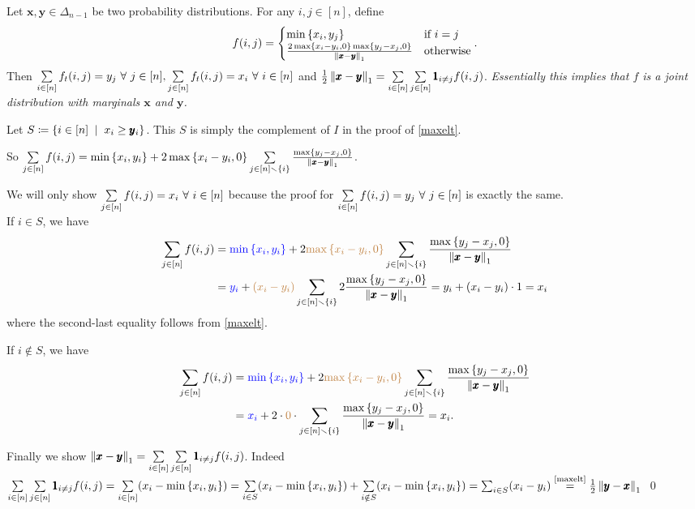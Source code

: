 \begin{lemma}\label{couple}
Let $\pmb x,\pmb y\in \Delta_{n-1}$ be two probability distributions. For any $i,j\in[n]$, define $$f(i,j) = \begin{cases}
\min\left\{x_{i},y_{j}\right\} & \text{if } i=j\\
\frac{2\max\left\{x_{i}-y_{i},0\right\}\max\left\{y_{j}-x_{j},0\right\}}{\left\lVert \pmb x - \pmb y \right\rVert_{1}} & \text{otherwise}
\end{cases}.$$ Then $\sum\limits_{i\in[n]}f_{t}(i,j) = y_{j} ~\forall~ j\in[n], \sum\limits_{j\in[n]}f_{t}(i,j) = x_{i}~\forall~ i\in[n]$ and $\frac12\left\lVert \pmb x - \pmb y \right\rVert_{1} = \sum\limits_{i\in [n]}\sum\limits_{j\in [n]}\pmb 1_{i\ne j} f(i,j)$. \textit{Essentially this implies that $f$ is a joint distribution with marginals $\pmb x$ and $\pmb y$.}
\end{lemma}
\begin{pf}
Let $S \sett \set{i\in [n]\st x_{i} \ge \pmb y_{i}}$. This $S$ is simply the complement of $I$ in the proof of \cref{maxelt}. 

So $\sum\limits_{j\in[n]}f(i,j)= \min\left\{x_{i},y_{i}\right\} + 2\max\left\{x_{i}-y_{i},0\right\}\sum\limits_{j\in[n]\smallsetminus\left\{i\right\}}\frac{\max\left\{y_{j}-x_{j},0\right\}}{\left\lVert \pmb x - \pmb y \right\rVert_{1}}$. 

We will only show $\sum\limits_{j\in[n]}f(i,j) = x_{i}~\forall~ i\in[n]$ because the proof for $\sum\limits_{i\in[n]}f(i,j) = y_{j} ~\forall~ j\in[n]$ is exactly the same.\\
If $i\in S$, we have
\begin{align*}
\sum\limits_{j\in[n]}f(i,j) 
&= {\color{blue}\min\left\{x_{i},y_{i}\right\}} + 2{\color{brown}\max\left\{x_{i}-y_{i},0\right\}}\sum\limits_{j\in[n]\smallsetminus\left\{i\right\}}\frac{\max\left\{y_{j}-x_{j},0\right\}}{\left\lVert \pmb x - \pmb y \right\rVert_{1}}\\
&= {\color{blue}y_{i}} + {\color{brown} (x_{i}-y_{i})}\sum\limits_{j\in[n]\smallsetminus\left\{i\right\}}2\frac{\max\left\{y_{j}-x_{j},0\right\}}{\left\lVert \pmb x - \pmb y \right\rVert_{1}} = y_{i} + (x_{i}-y_{i})\cdot 1 = x_{i}
\end{align*}
where the second-last equality follows from \cref{maxelt}.

If $i\notin S$, we have
\begin{align*}
\sum\limits_{j\in[n]}f(i,j) 
&= {\color{blue}\min\left\{x_{i},y_{i}\right\}} + 2{\color{brown}\max\left\{x_{i}-y_{i},0\right\}}\sum\limits_{j\in[n]\smallsetminus\left\{i\right\}}\frac{\max\left\{y_{j}-x_{j},0\right\}}{\left\lVert \pmb x - \pmb y \right\rVert_{1}}\\
&= {\color{blue} x_{i}} + 2\cdot {\color{brown} 0}\cdot\sum\limits_{j\in[n]\smallsetminus\left\{i\right\}}\frac{\max\left\{y_{j}-x_{j},0\right\}}{\left\lVert \pmb x - \pmb y \right\rVert_{1}}= x_{i}.
\end{align*}

Finally we show $\left\lVert \pmb x - \pmb y \right\rVert_{1} = \sum\limits_{i\in [n]}\sum\limits_{j\in [n]}\pmb 1_{i\ne j} f(i,j)$. Indeed $\sum\limits_{i\in[n]}\sum\limits_{j\in[n]}\pmb 1_{i\ne j}f(i,j) = \sum\limits_{i\in[n]} (x_{i}-\min\set{x_{i},y_{i}}) = \sum\limits_{i\in S} (x_{i}-\min\set{x_{i},y_{i}}) + \sum\limits_{i\notin S} (x_{i}-\min\set{x_{i},y_{i}}) = \sum_{i\in S}(x_{i}-y_{i}) \stackrel{\text{\cref{maxelt}}}{=} \frac12\norm{\pmb y-\pmb x}{1}$
\qed\end{pf}


